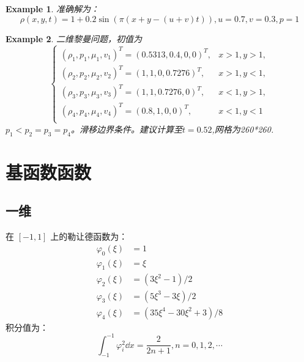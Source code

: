 \documentclass{article}
\newtheorem{example}{Example}
\numberwithin{equation}{subsection}    %
\begin{document}
\begin{appendix}
\begin{example}
        准确解为：
        \begin{equation}
            \rho(x,y,t) = 1+0.2\sin(\pi(x+y-(u+v)t)),u=0.7,v=0.3,p=1
        \end{equation}
    \end{example}
    \begin{example}
        二维黎曼问题\cite{RN13}，初值为
        \begin{equation}
            \begin{cases}
                \left(\rho_{1}, p_{1}, \mu_{1}, v_{1}\right)^{T}=(0.5313,0.4,0,0)^{T}, & x>1, y>1, \\
                \left(\rho_{2}, p_{2}, \mu_{2}, v_{2}\right)^{T}=(1,1,0,0.7276)^{T},   & x>1, y<1, \\
                \left(\rho_{3}, p_{3}, \mu_{3}, v_{3}\right)^{T}=(1,1,0.7276,0)^{T},   & x<1, y>1, \\
                \left(\rho_{4}, p_{4}, \mu_{4}, v_{4}\right)^{T}=(0.8,1,0,0)^{T},      & x<1, y<1  \\
            \end{cases}
        \end{equation}
        $p_1<p_2=p_3=p_4$。滑移边界条件。建议计算至$t=0.52$,网格为260*260.


    \end{example}
    \newpage
    \section{基函数函数}
    \cite{RN48}
    \subsection{一维}
    在 $[-1,1]$ 上的勒让德函数为：
    \begin{equation}
        \begin{aligned}
            \varphi_{0}(\xi) & =1                                        \\
            \varphi_{1}(\xi) & =\xi                                      \\
            \varphi_{2}(\xi) & =\left(3 \xi^{2}-1\right) / 2             \\
            \varphi_{3}(\xi) & =\left(5 \xi^{3}-3 \xi\right) / 2         \\
            \varphi_{4}(\xi) & =\left(35 \xi^{4}-30 \xi^{2}+3\right) / 8
        \end{aligned}
    \end{equation}
    积分值为：
    \begin{equation}
        \int_{-1}^{-1}\varphi_i^2\dd x=\frac{2}{2n+1},n=0,1,2,\cdots
    \end{equation}


\end{appendix}
\end{document}
